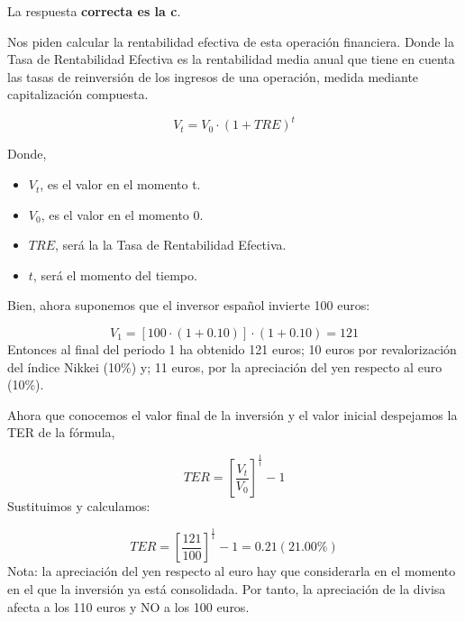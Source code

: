 \documentclass[
  letterpaper,
  DIV=11,
  numbers=noendperiod]{scrreprt}
\begin{document}
\begin{tcolorbox}[enhanced jigsaw, left=2mm, opacityback=0, colback=white, breakable, arc=.35mm, bottomrule=.15mm, rightrule=.15mm, toprule=.15mm, leftrule=.75mm, colframe=quarto-callout-tip-color-frame]
\begin{minipage}[t]{5.5mm}
\textcolor{quarto-callout-tip-color}{\faLightbulb}
\end{minipage}%
\begin{minipage}[t]{\textwidth - 5.5mm}

La respuesta \textbf{correcta es la c}.

Nos piden calcular la rentabilidad efectiva de esta operación
financiera. Donde la Tasa de Rentabilidad Efectiva es la rentabilidad
media anual que tiene en cuenta las tasas de reinversión de los ingresos
de una operación, medida mediante capitalización compuesta.

\[V_t=V_0\cdot\left(1+TRE\right)^t\]

Donde,

\begin{itemize}
\item
  \(V_t\), es el valor en el momento t.
\item
  \(V_0\), es el valor en el momento 0.
\item
  \(TRE\), será la la Tasa de Rentabilidad Efectiva.
\item
  \(t\), será el momento del tiempo.
\end{itemize}

Bien, ahora suponemos que el inversor español invierte 100 euros:

\[V_1=\left[100\cdot(1+0.10)\right]\cdot(1+0.10)=121\] Entonces al final
del periodo 1 ha obtenido 121 euros; 10 euros por revalorización del
índice Nikkei (10\%) y; 11 euros, por la apreciación del yen respecto al
euro (10\%).

Ahora que conocemos el valor final de la inversión y el valor inicial
despejamos la TER de la fórmula,

\[TER=\left[\frac{V_t }{V_0 }\right] ^{\frac{1}{t}}-1\] Sustituimos y
calculamos:

\[TER=\left[\frac{121}{100}\right] ^{\frac{1}{1}}-1=0.21(21.00\%)\]
Nota: la apreciación del yen respecto al euro hay que considerarla en el
momento en el que la inversión ya está consolidada. Por tanto, la
apreciación de la divisa afecta a los 110 euros y NO a los 100 euros.

\end{minipage}%
\end{tcolorbox}
\end{document}
